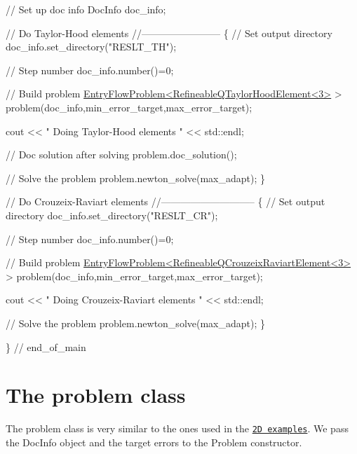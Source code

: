 \begin{DoxyCodeInclude}
 

 \textcolor{comment}{// Set up doc info}
 DocInfo doc\_info;
 
 \textcolor{comment}{// Do Taylor-Hood elements}
 \textcolor{comment}{//------------------------}
 \{
  \textcolor{comment}{// Set output directory}
  doc\_info.set\_directory(\textcolor{stringliteral}{"RESLT\_TH"});
  
  \textcolor{comment}{// Step number}
  doc\_info.number()=0;
  
  \textcolor{comment}{// Build problem}
  \hyperlink{classEntryFlowProblem}{EntryFlowProblem<RefineableQTaylorHoodElement<3>} > 
   problem(doc\_info,min\_error\_target,max\_error\_target);
  
  cout << \textcolor{stringliteral}{" Doing Taylor-Hood elements "} << std::endl;


  \textcolor{comment}{// Doc solution after solving}
  problem.doc\_solution();
  
  \textcolor{comment}{// Solve the problem }
  problem.newton\_solve(max\_adapt);
 \}


 \textcolor{comment}{// Do Crouzeix-Raviart elements}
 \textcolor{comment}{//-----------------------------}
 \{
  \textcolor{comment}{// Set output directory}
  doc\_info.set\_directory(\textcolor{stringliteral}{"RESLT\_CR"});
  
  \textcolor{comment}{// Step number}
  doc\_info.number()=0;
  
  \textcolor{comment}{// Build problem}
  \hyperlink{classEntryFlowProblem}{EntryFlowProblem<RefineableQCrouzeixRaviartElement<3>}
       >
   problem(doc\_info,min\_error\_target,max\_error\_target);
  
  cout << \textcolor{stringliteral}{" Doing Crouzeix-Raviart elements "} << std::endl;
  
  \textcolor{comment}{// Solve the problem }
  problem.newton\_solve(max\_adapt);
 \}

\} \textcolor{comment}{// end\_of\_main}

\end{DoxyCodeInclude}




 

\hypertarget{index_problem}{}\section{The problem class}\label{index_problem}
The problem class is very similar to the ones used in the \href{../../circular_driven_cavity/html/index.html#problem}{\tt 2D examples}. We pass the {\ttfamily Doc\+Info} object and the target errors to the {\ttfamily Problem} constructor.

